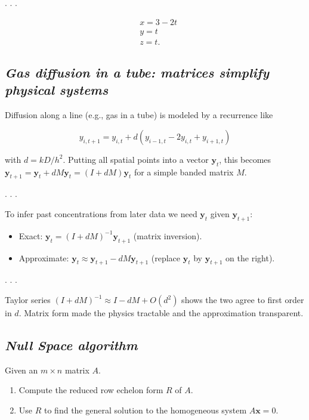 \documentclass[
  letterpaper,
  DIV=11,
  numbers=noendperiod]{scrartcl}
\providecommand{\tightlist}{%
  \setlength{\itemsep}{0pt}\setlength{\parskip}{0pt}}\usepackage{longtable,booktabs,array}
\begin{document}
. . .

\[
\begin{aligned}
& x=3-2 t \\
& y=t \\
& z=t .
\end{aligned}
\]

\subsection{\texorpdfstring{\emph{Gas diffusion in a tube: matrices
simplify physical
systems}}{Gas diffusion in a tube: matrices simplify physical systems}}\label{gas-diffusion-in-a-tube-matrices-simplify-physical-systems}

Diffusion along a line (e.g., gas in a tube) is modeled by a recurrence
like

\[
y_{i, t+1}=y_{i, t}+d\left(y_{i-1, t}-2 y_{i, t}+y_{i+1, t}\right)
\]

with \(d=kD/h^2\). Putting all spatial points into a vector
\(\mathbf{y}_t\), this becomes
\(\mathbf{y}_{t+1}=\mathbf{y}_t+dM\mathbf{y}_t=(I+dM)\mathbf{y}_t\) for
a simple banded matrix \(M\).

. . .

To infer past concentrations from later data we need \(\mathbf{y}_t\)
given \(\mathbf{y}_{t+1}\):

\begin{itemize}
\tightlist
\item
  Exact: \(\mathbf{y}_t=(I+dM)^{-1}\mathbf{y}_{t+1}\) (matrix
  inversion).
\item
  Approximate:
  \(\mathbf{y}_t\approx \mathbf{y}_{t+1}-dM\mathbf{y}_{t+1}\) (replace
  \(\mathbf{y}_t\) by \(\mathbf{y}_{t+1}\) on the right).
\end{itemize}

. . .

Taylor series \((I+dM)^{-1}\approx I-dM+O(d^2)\) shows the two agree to
first order in \(d\). Matrix form made the physics tractable and the
approximation transparent.

\subsection{\texorpdfstring{\emph{Null Space
algorithm}}{Null Space algorithm}}\label{null-space-algorithm}

Given an \(m \times n\) matrix \(A\).

\begin{enumerate}
\def\labelenumi{\arabic{enumi}.}
\item
  Compute the reduced row echelon form \(R\) of \(A\).
\item
  Use \(R\) to find the general solution to the homogeneous system
  \(A \mathbf{x}=0\).
\end{enumerate}
\end{document}
